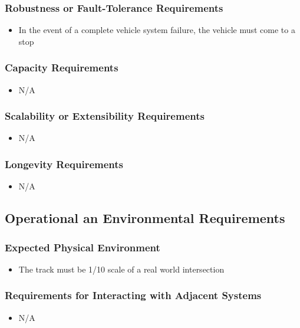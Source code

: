 \documentclass [12pt]{article}
\begin{document}
\subsubsection{Robustness or Fault-Tolerance Requirements }
	\begin{itemize}
		\item In the event of a complete vehicle system failure, the vehicle must come to a stop
	\end{itemize}
	
\subsubsection{Capacity Requirements }
	\begin{itemize}
		\item N/A
	\end{itemize}

\subsubsection{Scalability or Extensibility Requirements }
	\begin{itemize}
		\item N/A
	\end{itemize}
		
\subsubsection{Longevity Requirements }
	\begin{itemize}
		\item N/A
	\end{itemize}

\subsection{Operational an Environmental Requirements}
\subsubsection{Expected Physical Environment }
	\begin{itemize}
		\item The track must be 1/10 scale of a real world intersection
	\end{itemize}
		
\subsubsection{Requirements for Interacting with Adjacent Systems}
	\begin{itemize}
		\item N/A
	\end{itemize}
\end{document}
